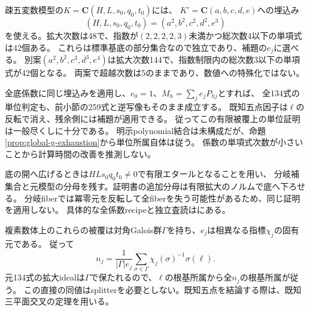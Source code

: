 \documentclass[a4paper,11pt]{ltjsarticle}
\theoremstyle{definition}
\newcommand{\CC}{\mathbf C}
\begin{document}
疎五変数模型の\(K=\CC(H,L,s_0,q_0,t_0)\)には、
\(K'=\CC(a,b,c,d,e)\)への埋込み
\[
 (H,L,s_0,q_0,t_0)=(a^2,b^2,c^2,d^2,e^3)
\]
を使える。拡大次数は48で、指数が\((2,2,2,2,3)\)未満かつ総次数4以下の単項式は42個ある。
これらは標準基底の部分集合なので独立であり、補題の\(e_j\)に選べる。
別案\((a^2,b^2,c^3,d^3,e^4)\)は拡大次数144で、指数制限内の総次数3以下の単項式が42個となる。
両案で超越次数は5のままであり、数値への特殊化ではない。

全底係数に同じ埋込みを適用し、\(e_0=1\)、\(M_h=\sum_j e_jP_{hj}\)とすれば、
全134式の単位判定も、前小節の259式と逆写像もそのまま成立する。
既知五点因子は\(\ell\)の反転で消え、残余側には補題が適用できる。
従ってこの有限被覆上の単位証明は一般尽くしに十分である。
明示polynomial結合は未構成だが、命題\ref{prop:global-g-exhaustion}から単位所属自体は従う。
係数の単項式次数が小さいことから計算時間の改善を推測しない。

底の開へ広げるときは\(HLs_0q_0t_0\ne0\)で有限エタールとなることを用い、
分岐補集合と元模型の分母を残す。証明書の追加分母は有限拡大のノルムで底へ下ろせる。
分岐fiberでは冪零元を反転して全fiberを失う可能性があるため、同じ証明を適用しない。
具体的な全係数recipeと独立査読はにある。

複素数体上のこれらの被覆は対角Galois群\(\Gamma\)を持ち、\(e_j\)は相異なる指標\(\chi_j\)の固有元である。
従って
\[
 n_j=\frac{1}{|\Gamma|e_j}\sum_{\sigma\in\Gamma}\chi_j(\sigma)^{-1}\sigma(\ell).
\]
元134式の拡大idealは\(\Gamma\)で保たれるので、\(\ell\)の根基所属から全\(n_j\)の根基所属が従う。
この直接の同値はsplitterを必要としない。既知五点を結論する際は、既知三平面交叉の定理を用いる。
\end{document}
